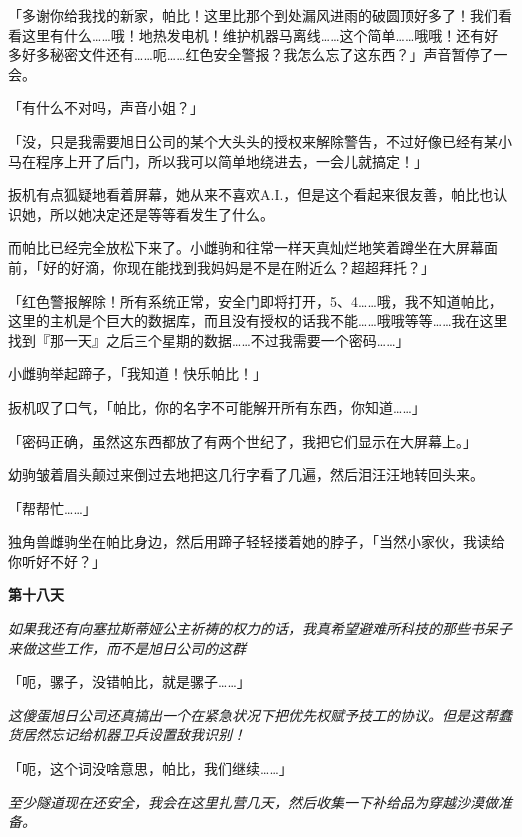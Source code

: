 「多谢你给我找的新家，帕比！这里比那个到处漏风进雨的破圆顶好多了！我们看看这里有什么……哦！地热发电机！维护机器马离线……这个简单……哦哦！还有好多好多秘密文件还有……呃……红色安全警报？我怎么忘了这东西？」声音暂停了一会。

「有什么不对吗，声音小姐？」

「没，只是我需要旭日公司的某个大头头的授权来解除警告，不过好像已经有某小马在程序上开了后门，所以我可以简单地绕进去，一会儿就搞定！」

扳机有点狐疑地看着屏幕，她从来不喜欢A.I.，但是这个看起来很友善，帕比也认识她，所以她决定还是等等看发生了什么。

而帕比已经完全放松下来了。小雌驹和往常一样天真灿烂地笑着蹲坐在大屏幕面前，「好的好滴，你现在能找到我妈妈是不是在附近么？超超拜托？」

「红色警报解除！所有系统正常，安全门即将打开，5、4……哦，我不知道帕比，这里的主机是个巨大的数据库，而且没有授权的话我不能……哦哦等等……我在这里找到『那一天』之后三个星期的数据……不过我需要一个密码……」

小雌驹举起蹄子，「我知道！快乐帕比！」

扳机叹了口气，「帕比，你的名字不可能解开所有东西，你知道……」

「密码正确，虽然这东西都放了有两个世纪了，我把它们显示在大屏幕上。」

幼驹皱着眉头颠过来倒过去地把这几行字看了几遍，然后泪汪汪地转回头来。

「帮帮忙……」

独角兽雌驹坐在帕比身边，然后用蹄子轻轻搂着她的脖子，「当然小家伙，我读给你听好不好？」

\medskip

\begin{center}
\textbf{第十八天}
\end{center}

\emph{如果我还有向塞拉斯蒂娅公主祈祷的权力的话，我真希望避难所科技的那些书呆子来做这些工作，而不是旭日公司的这群}

\medskip


「呃，骡子，没错帕比，就是骡子……」

\medskip

\emph{这傻蛋旭日公司还真搞出一个在紧急状况下把优先权赋予技工的协议。但是这帮蠢货居然忘记给机器卫兵设置敌我识别！}

\medskip

「呃，这个词没啥意思，帕比，我们继续……」

\medskip

\emph{至少隧道现在还安全，我会在这里扎营几天，然后收集一下补给品为穿越沙漠做准备。}

